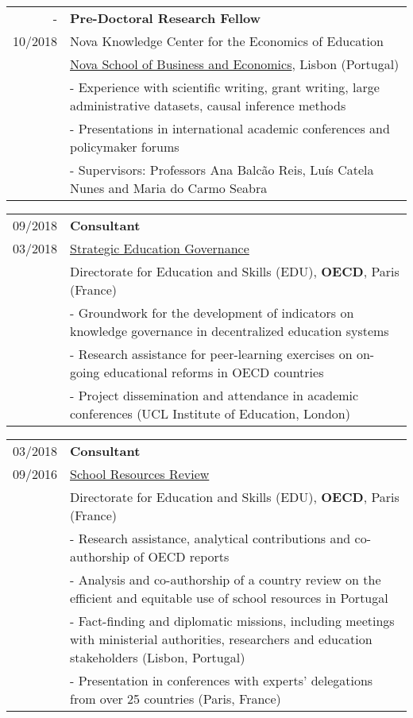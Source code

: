 \documentclass[a4paper,11pt]{article} %
\begin{document}
\begin{tabular}{r|p{13cm}}
	- & \textbf{Pre-Doctoral Research Fellow} \\
	10/2018 & Nova Knowledge Center for the Economics of Education \\  & \href{https://www2.novasbe.unl.pt/en/}{Nova School of Business and Economics}, Lisbon (Portugal) \\ 
		& - Experience with scientific writing, grant writing, large administrative datasets, causal inference methods \\
		& - Presentations in international academic conferences and policymaker forums \\ 
		& - Supervisors: Professors Ana Balcão Reis, Luís Catela Nunes and Maria do Carmo Seabra \\
	
	
\end{tabular}

\begin{tabular}{r|p{13cm}}
	09/2018 & \textbf{Consultant} \\
	03/2018 & \href{http://www.oecd.org/education/ceri/strategic-education-governance.htm}{Strategic Education Governance} \\
	& Directorate for Education and Skills (EDU), \textbf{OECD}, Paris (France) \\ 
	& - Groundwork for the development of indicators on knowledge governance in decentralized education systems \\
	& - Research assistance for peer-learning exercises on on-going educational reforms in OECD countries \\
	& - Project dissemination and attendance in academic conferences (UCL Institute of Education, London)\\
\end{tabular}

\begin{tabular}{r|p{13cm}}
	03/2018 & \textbf{Consultant} \\
	09/2016 & \href{http://www.oecd.org/education/school-resources-review/}{School Resources Review} \\ 
	& Directorate for Education and Skills (EDU), \textbf{OECD}, Paris (France) \\ 
	& - Research assistance, analytical contributions and co-authorship of OECD reports \\
	& - Analysis and co-authorship of a country review on the efficient and equitable use of school resources in Portugal \\
	& - Fact-finding and diplomatic missions, including meetings with ministerial authorities, researchers and education stakeholders (Lisbon, Portugal) \\
	& - Presentation in conferences with experts' delegations from over 25 countries (Paris, France) \\
\end{tabular}
\end{document}
